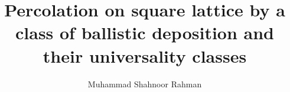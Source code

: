 \title{Percolation on square lattice by a class of ballistic deposition and their universality classes}



\author{Muhammad Shahnoor Rahman}









     
